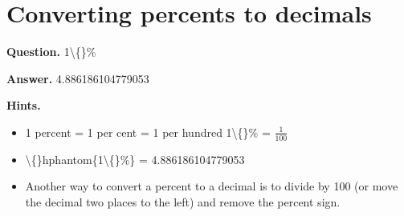 \documentclass{article}
\begin{document}
\section*{Converting percents to decimals}
\textbf{Question.} 1\textbackslash\{\}\%

\textbf{Answer.} 4.886186104779053

\textbf{Hints.}
\begin{itemize}
  \item 1 percent = 1 per cent = 1 per hundred
                    1\textbackslash\{\}\% = $\frac{1}{100}$
  \item \textbackslash\{\}hphantom\{1\textbackslash\{\}\%\} = 4.886186104779053
  \item Another way to convert a percent to a decimal is to divide by 100 (or move the decimal two places to the left) and remove the percent sign.
\end{itemize}
\end{document}
